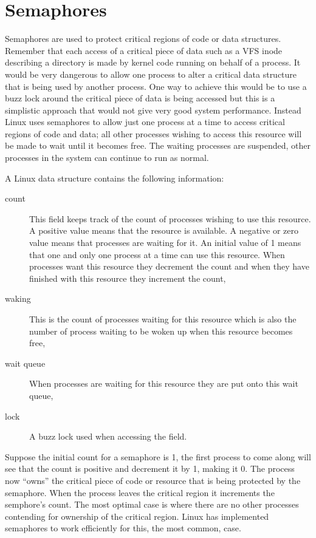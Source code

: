 \section{Semaphores}
\label{kernel-semaphore-section}
Semaphores are used to protect critical regions of code or data structures.
Remember that each access of a critical piece of data such as a VFS inode describing
a directory is made by kernel code running on behalf of a process.
It would be very dangerous to allow one process to alter a critical data structure
that is being used by another process.
One way to achieve this would be  to use a buzz lock around the critical piece
of data is being accessed but this is a simplistic approach that would not give 
very good system performance. 
Instead Linux uses semaphores to allow just one process at a time to access
critical regions of code and data; all other processes wishing to access this
resource will be made to wait until it becomes free.
The waiting processes are suspended, other processes in the system can continue
to run as normal.

A Linux  data structure contains the following information:
\begin{description}
	\item [count]	 This field keeps track of the count of processes wishing
		to use this resource.  A positive value means that the resource is
		available.  A negative or zero value means that processes are waiting
		for it.  An initial value of 1 means that one and only one process at
		a time can use this resource.  When processes want this resource they
		decrement the count and when they have finished with this resource they
		increment the count,
	\item [waking] This is the count of processes waiting for this resource which is 
		also the number of process waiting to be woken up when this resource
		becomes free,
	\item [wait queue] When processes are waiting for this resource they are put
		onto this wait queue,
	\item [lock] A buzz lock used when accessing the  field.
\end{description}

Suppose the initial count for a semaphore is 1, the first process to come along
will see that the count is positive and decrement it by 1, making it 0.  
The process now ``owns'' the critical piece of code or resource that is being protected
by the semaphore.
When the process leaves the critical region it increments the semphore's count.
The most optimal case is where there are no other processes contending for ownership of
the critical region.
Linux has implemented semaphores to work efficiently for this, the most common, case.

